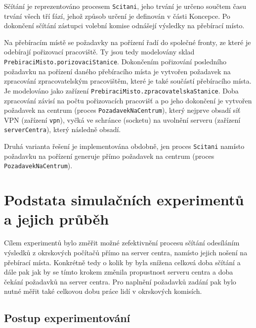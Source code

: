 \documentclass[12pt,a4paper,titlepage,final]{article}
\begin{document}
Sčítání je reprezentováno procesem \texttt{Scitani}, jeho trvání je určeno součtem času trvání všech tří fází, jehož způsob určení je definován v části Koncepce. Po dokončení sčítání zástupci volební komise odnášejí výsledky na přebírací místo.

Na přebíracím místě se požadavky na pořízení řadí do společné fronty, ze které je odebírají pořizovací pracoviště. Ty jsou tedy modelovány sklad \texttt{PrebiraciMisto.porizovaciStanice}. Dokončením pořizování posledního požadavku na pořízení daného přebíracího místa je vytvořen požadavek na zpracování zpracovatelským pracovištěm, které je také součástí přebíracího místa. Je modelováno jako zařízení \texttt{PrebiraciMisto.zpracovatelskaStanice}. Doba zpracování závisí na počtu pořizovacích pracovišť a po jeho dokončení je vytvořen požadavek na centrum (proces \texttt{PozadavekNaCentrum}), který nejprve obsadí síť VPN (zařízení \texttt{vpn}), vyčká ve schránce (socketu) na uvolnění serveru (zařízení \texttt{serverCentra}), který následně obsadí.

Druhá varianta řešení je implementována obdobně, jen proces \texttt{Scitani} namísto požadavku na pořízení generuje přímo požadavek na centrum (proces \texttt{PozadavekNaCentrum}).

\section{Podstata simulačních experimentů a jejich průběh} \label{podstata}

Cílem experimentů bylo změřit možné zefektivnění procesu sčítání odesíláním výsledků z okrskových počítačů přímo na server centra, namísto jejich nošení na přebírací místa. Konkrétně tedy o kolik by byla snížena celková doba sčítání a dále pak jak by se tímto krokem změnila propustnost serveru centra a doba čekání požadavků na server centra. Pro naplnění požadavků zadání pak bylo nutné měřit také celkovou dobu práce lidí v okrskových komisích.

\subsection{Postup experimentování}
\end{document}
